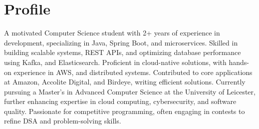 \vspace{3pt}
\section{\Large Profile}
\sloppy
\location{\vspace{-8pt}}
A motivated Computer Science student with 2+ years of experience in development, specializing in Java, Spring Boot, and microservices. Skilled in building scalable systems, REST APIs, and optimizing database performance using Kafka, and Elasticsearch. Proficient in cloud-native solutions, with hands-on experience in AWS, and distributed systems. Contributed to core applications at Amazon, Accolite Digital, and Birdeye, writing efficient solutions. Currently pursuing a Master’s in Advanced Computer Science at the University of Leicester, further enhancing expertise in cloud computing, cybersecurity, and software quality. Passionate for competitive programming, often engaging in contests to refine DSA and problem-solving skills.
